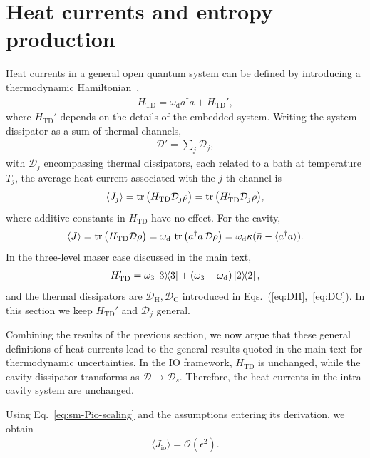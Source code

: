 \documentclass[aps,twocolumn,10pt,prl,floatfix,nofootinbib, superscriptaddress]{revtex4-2}
\newcommand{\nb}{\bar{n}}
\begin{document}
\section{Heat currents and entropy production}

Heat currents in a general open quantum system can be defined by introducing a thermodynamic Hamiltonian~\cite{Potts_2021, potts2024quantumthermodynamics, schrauwen2025},
\begin{align}
    H_\text{TD} = \omega_\text{d} a^\dagger a + H_\text{TD}',
\end{align}
where $H_\text{TD}'$ depends on the details of the embedded system.
Writing the system dissipator as a sum of thermal channels,
\begin{align}
    \mathcal{D}' = \sum_j \mathcal{D}_j,
\end{align}
with $\mathcal{D}_j$ encompassing thermal dissipators, each related to a bath at temperature $T_j$, the average heat current associated with the $j$-th channel is
\begin{align}
    \langle J_j \rangle = \tr\big(H_\text{TD} \mathcal{D}_j \rho\big) = \tr\big(H_\text{TD}' \mathcal{D}_j \rho\big),
\end{align}
where additive constants in $H_\text{TD}$ have no effect.
For the cavity,
\begin{align}
    \langle J \rangle = \tr\big(H_\text{TD}\mathcal{D}\rho\big) = \omega_\text{d}\,\tr\big(a^\dagger a\,\mathcal{D}\rho\big)=\omega_\text{d} \kappa (\nb - \langle a^\dagger a\rangle).
\end{align}
In the three-level maser case discussed in the main text,
\begin{align}
    H_\text{TD}' = \omega_3 \dyad{3}{3} + (\omega_3  - \omega_\text{d}) \dyad{2}{2},
\end{align}
and the thermal dissipators are $\mathcal{D}_\text{H}, \mathcal{D}_\text{C}$ introduced in Eqs.~(\ref{eq:DH},~\ref{eq:DC}).
In this section we keep $H_\text{TD}'$ and $\mathcal{D}_j$ general.

Combining the results of the previous section, we now argue that these general definitions of heat currents lead to the general results quoted in the main text for thermodynamic uncertainties.
In the IO framework, $H_\text{TD}$ is unchanged, while the cavity dissipator transforms as $\mathcal{D}\to\mathcal{D}_s$.
Therefore, the heat currents in the intra-cavity system are unchanged.

Using Eq.~\eqref{eq:sm-Pio-scaling} and the assumptions entering its derivation, we obtain
\begin{align}
    \langle J_\text{io} \rangle = \mathcal{O}(\epsilon^2).
\end{align}
\end{document}
